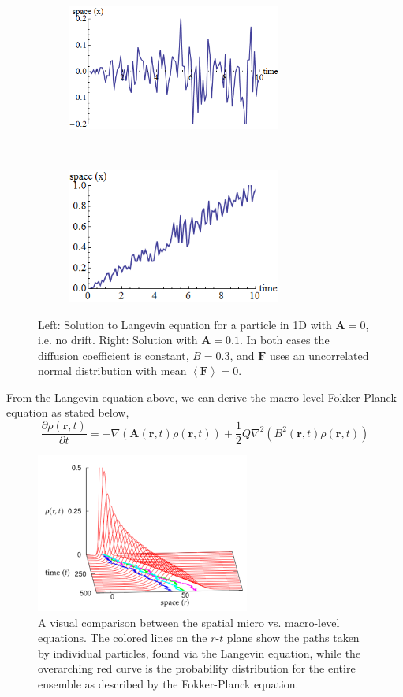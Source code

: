 \documentclass[11pt, onecolumn, compsoc, letterpaper]{article}
\newcommand{\PD}[2][t]{\frac{\partial #2}{\partial #1}}
\newcommand{\V}[1]{\mathbf{#1}}
\begin{document}
\begin{figure}[!htb]
\centering\begin{subfigure}{.5\textwidth}
\centering\includegraphics[width=7cm]{../assets/LanNoDrift.png}
\end{subfigure}~
\centering\begin{subfigure}{.5\textwidth}
\centering\includegraphics[width=7cm]{../assets/LanDrift.png}
\end{subfigure}
\caption{Left: Solution to Langevin equation for a particle in 1D with $\V{A} = 0$, i.e. no drift. Right: Solution with $\V{A} = 0.1$. In both cases the diffusion coefficient is constant, $B = 0.3$, and $\V{F}$ uses an uncorrelated normal distribution with mean $\left<\V{F}\right> = 0$.}\label{fig:lan}
\end{figure}

From the Langevin equation above, we can derive the macro-level Fokker-Planck equation as stated below,
\begin{equation}
\PD{\rho(\V{r},t)} = -\nabla(\V{A}(\V{r},t)\rho(\V{r},t))+\frac{1}{2}Q\nabla^2(B^2(\V{r},t)\rho(\V{r},t))
\end{equation}
\begin{figure}[!ht]
\centering\includegraphics[width=7cm]{../assets/fokkerPlanck.png}
\centering\caption{A visual comparison between the spatial micro vs. macro-level equations. The colored lines on the $r$-$t$ plane show the paths taken by individual particles, found via the Langevin equation, while the overarching red curve is the probability distribution for the entire ensemble as described by the Fokker-Planck equation.}\label{fig:fokkerplanck}
\end{figure}
\end{document}
